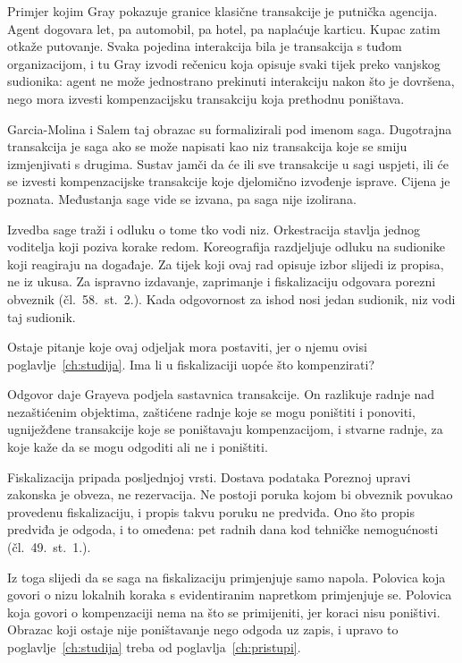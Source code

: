 Primjer kojim Gray pokazuje granice klasične transakcije je putnička
agencija. Agent dogovara let, pa automobil, pa hotel, pa naplaćuje karticu.
Kupac zatim otkaže putovanje. Svaka pojedina interakcija bila je transakcija
s tuđom organizacijom, i tu Gray izvodi rečenicu koja opisuje svaki tijek
preko vanjskog sudionika: agent ne može jednostrano prekinuti interakciju
nakon što je dovršena, nego mora izvesti kompenzacijsku transakciju koja
prethodnu poništava.

Garcia-Molina i Salem taj obrazac su formalizirali pod imenom
saga\cite{garciamolina1987sagas}. Dugotrajna transakcija je saga ako se može
napisati kao niz transakcija koje se smiju izmjenjivati s drugima. Sustav
jamči da će ili sve transakcije u sagi uspjeti, ili će se izvesti
kompenzacijske transakcije koje djelomično izvođenje isprave. Cijena je
poznata. Međustanja sage vide se izvana, pa saga nije izolirana.

Izvedba sage traži i odluku o tome tko vodi niz. Orkestracija stavlja jednog
voditelja koji poziva korake redom. Koreografija razdjeljuje odluku na
sudionike koji reagiraju na
događaje\cite{megargel2021orchestration}. Za tijek koji ovaj rad opisuje
izbor slijedi iz propisa, ne iz ukusa. Za ispravno izdavanje, zaprimanje i
fiskalizaciju odgovara porezni obveznik (čl.~58.~st.~2.). Kada odgovornost
za ishod nosi jedan sudionik, niz vodi taj sudionik.

Ostaje pitanje koje ovaj odjeljak mora postaviti, jer o njemu ovisi
poglavlje~\ref{ch:studija}. Ima li u fiskalizaciji uopće što kompenzirati?

Odgovor daje Grayeva podjela sastavnica transakcije. On razlikuje radnje nad
nezaštićenim objektima, zaštićene radnje koje se mogu poništiti i ponoviti,
ugniježđene transakcije koje se poništavaju kompenzacijom, i stvarne radnje,
za koje kaže da se mogu odgoditi ali ne i poništiti.

Fiskalizacija pripada posljednjoj vrsti. Dostava podataka Poreznoj upravi
zakonska je obveza, ne rezervacija. Ne postoji poruka kojom bi obveznik
povukao provedenu fiskalizaciju, i propis takvu poruku ne predviđa. Ono što
propis predviđa je odgoda, i to omeđena: pet radnih dana kod tehničke
nemogućnosti (čl.~49.~st.~1.).

Iz toga slijedi da se saga na fiskalizaciju primjenjuje samo napola.
Polovica koja govori o nizu lokalnih koraka s evidentiranim napretkom
primjenjuje se. Polovica koja govori o kompenzaciji nema na što se primijeniti,
jer koraci nisu poništivi. Obrazac koji ostaje nije poništavanje nego
odgoda uz zapis, i upravo to poglavlje~\ref{ch:studija} treba od
poglavlja~\ref{ch:pristupi}.

